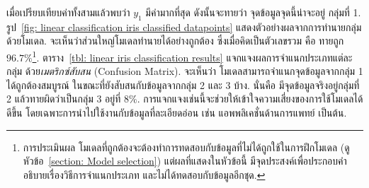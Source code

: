 เมื่อเปรียบเทียบค่าทั้งสามแล้วพบว่า $y_1$ มีค่ามากที่สุด ดังนั้นจะทายว่า จุดข้อมูลจุดนี้น่าจะอยู่ กลุ่มที่ 1.
รูป~\ref{fig: linear classification iris classified datapoints} แสดงตัวอย่างผลจากการทำนายกลุ่มด้วยโมเดล.
จะเห็นว่าส่วนใหญ่โมเดลทำนายได้อย่างถูกต้อง ซึ่งเมื่อคิดเป็นตัวเลขรวม คือ ทายถูก $96.7 \%$\footnote{การประเมินผล โมเดลที่ถูกต้องจะต้องทำการทดสอบกับข้อมูลที่ไม่ได้ถูกใช้ในการฝึกโมเดล (ดูหัวข้อ~\ref{section: Model selection}) แต่ผลที่แสดงในหัวข้อนี้ มีจุดประสงค์เพื่อประกอบคำอธิบายเรื่องวิธีการจำแนกประเภท และไม่ได้ทดสอบกับข้อมูลอีกชุด.}.
%
ตาราง~\ref{tbl: linear iris classification results} แจกแจงผลการจำแนกประเภทแต่ละกลุ่ม
ด้วย\textit{เมตริกซ์สับสน} (Confusion Matrix).
จะเห็นว่า โมเดลสามารถจำแนกจุดข้อมูลจากกลุ่ม 1 ได้ถูกต้องสมบูรณ์ 
ในขณะที่ยังสับสนกับข้อมูลจากกลุ่ม 2 และ 3 บ้าง.
นั่นคือ มีจุดข้อมูลจริงอยู่กลุ่มที่ 2 แล้วทายผิดว่าเป็นกลุ่ม 3 อยู่ที่ $8\%$.
การแจกแจงเช่นนี้จะช่วยให้เข้าใจความเสี่ยงของการใช้โมเดลได้ดีขึ้น 
โดยเฉพาะการนำไปใช้งานกับข้อมูลที่ละเอียดอ่อน เช่น แอพพลิเคชั่นด้านการแพทย์ เป็นต้น.

